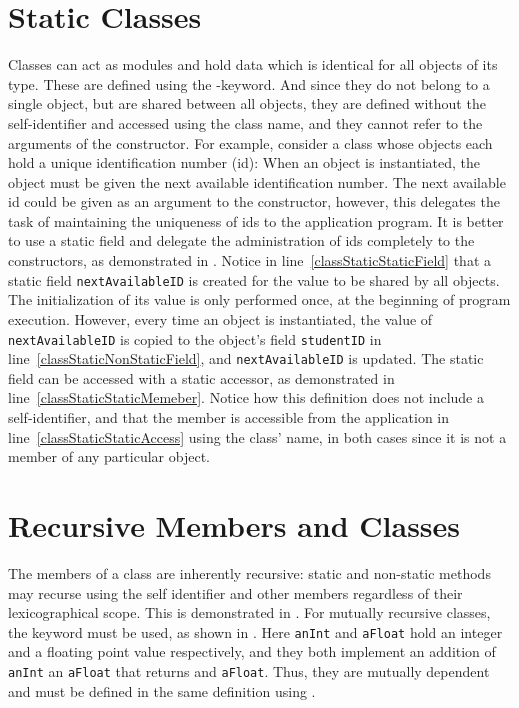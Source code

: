 \documentclass[fsharpNotes.tex]{subfiles}
\begin{document}
\section{Static Classes}
Classes can act as modules and hold data which is identical for all objects of its type. These are defined using the -keyword. And since they do not belong to a single object, but are shared between all objects, they are defined without the self-identifier and accessed using the class name, and they cannot refer to the arguments of the constructor. For example, consider a class whose objects each hold a unique identification number (id): When an object is instantiated, the object must be given the next available identification number. The next available id could be given as an argument to the constructor, however, this delegates the task of maintaining the uniqueness of ids to the application program. It is better to use a static field and delegate the administration of ids completely to the constructors, as demonstrated in .
%
%
Notice in line~\ref{classStaticStaticField} that a static field \lstinline{nextAvailableID} is created for the value to be shared by all objects. The initialization of its value is only performed once, at the beginning of program execution. However, every time an object is instantiated, the value of \lstinline{nextAvailableID} is copied to the object's field \lstinline{studentID} in line~\ref{classStaticNonStaticField}, and \lstinline{nextAvailableID} is updated. The static field can be accessed with a static accessor, as demonstrated in line~\ref{classStaticStaticMemeber}. Notice how this definition does not include a self-identifier, and that the member is accessible from the application in line~\ref{classStaticStaticAccess} using the class' name, in both cases since it is not a member of any particular object.

\section{Recursive Members and Classes}
The members of a class are inherently recursive: static and non-static methods may recurse using the self identifier and other members regardless of their lexicographical scope. This is demonstrated in .
%
%
For mutually recursive classes, the keyword  must be used, as shown in .
%
%
Here \lstinline{anInt} and \lstinline{aFloat} hold an integer and a floating point value respectively, and they both implement an addition of \lstinline{anInt} an \lstinline{aFloat} that returns and \lstinline{aFloat}. Thus, they are mutually dependent and must be defined in the same  definition using .
\end{document}
